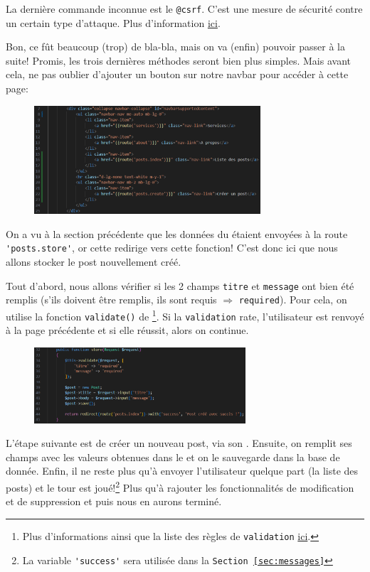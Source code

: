 La dernière commande inconnue est le \verb|@csrf|. C'est une mesure de sécurité contre un certain type d'attaque. Plus d'information \href{https://laravel.com/docs/10.x/csrf}{ici}.

Bon, ce fût beaucoup (trop) de bla-bla, mais on va (enfin) pouvoir passer à la suite! Promis, les trois dernières méthodes seront bien plus simples. Mais avant cela, ne pas oublier d'ajouter un bouton sur notre navbar pour accéder à cette page:

\begin{figure}[!h]
    \centering
    \includegraphics[width=0.75\textwidth]{figures-C1/post_create_navbar.pdf}
\end{figure}

\newpage

\label{sec:posts_store}

On a vu à la section précédente que les données du \form{} étaient envoyées à la route \verb|'posts.store'|, or cette \route{} redirige vers cette fonction! C'est donc ici que nous allons stocker le post nouvellement créé.

Tout d'abord, nous allons vérifier si les 2 champs \verb|titre| et \verb|message| ont bien été remplis (s'ils doivent être remplis, ils sont requis $\Rightarrow$ \verb|required|). Pour cela, on utilise la fonction \verb|validate()| de \laravel\footnote{Plus d'informations ainsi que la liste des règles de \texttt{validation} \href{https://laravel.com/docs/10.x/validation#quick-writing-the-validation-logic}{ici}.}. Si la \texttt{validation} rate, l'utilisateur est renvoyé à la page précédente et si elle réussit, alors on continue.

\begin{figure}
    \vspace{-0.5cm}
    \includegraphics[width=0.7\textwidth]{figures-C1/post_store_controller.pdf}
\end{figure}
L'étape suivante est de créer un nouveau post, via son \model{}. Ensuite, on remplit ses champs avec les valeurs obtenues dans le \form{} et on le sauvegarde dans la base de donnée. Enfin, il ne reste plus qu'à envoyer l'utilisateur quelque part (la liste des posts) et le tour est joué!\footnote{La variable \verb|'success'| sera utilisée dans la \texttt{Section~\ref{sec:messages}}} Plus qu'à rajouter les fonctionnalités de modification et de suppression et puis nous en aurons terminé.

